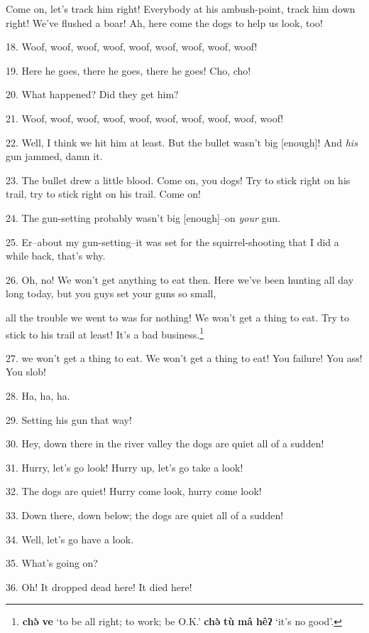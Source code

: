 Come on, let's track him right! Everybody at his ambush-point, track him down right!
We've flushed a boar! Ah, here come the dogs to help us look, too!

18. Woof, woof, woof, woof, woof, woof, woof, woof, woof!

19. Here he goes, there he goes, there he goes! Cho, cho!


20. What happened? Did they get him?

21. Woof, woof, woof, woof, woof, woof, woof, woof, woof, woof!

22. Well, I think we hit him at least. But the bullet wasn't big [enough]! And
\textit{his} gun jammed, damn it.

23. The bullet drew a little blood. Come on, you dogs! Try to stick right on his
trail, try to stick right on his trail. Come on!

24. The gun-setting probably wasn't big [enough]--on \textit{your} gun.

25. Er--about my gun-setting--it was set for the squirrel-shooting that I did a
while back, that's why.

26. Oh, no! We won't get anything to eat then. Here we've been hunting all day
long today, but you guys set your guns so small,

all the trouble we went to was for nothing! We won't get a thing to eat. Try to
stick to his trail at least! It's a bad business.\footnote{\textbf{chə̀} \textbf{ve} `to be all right; to work; be O.K.' \textbf{chə̀} \textbf{tù} \textbf{mâ} \textbf{hêʔ} `it's no good'.}

27. we won't get a thing to eat. We won't get a thing to eat! You failure! You
ass! You slob!

28. Ha, ha, ha.

29. Setting his gun that way!

30. Hey, down there in the river valley the dogs are quiet all of a sudden!

31. Hurry, let's go look! Hurry up, let's go take a look!

32. The dogs are quiet! Hurry come look, hurry come look!

33. Down there, down below; the dogs are quiet all of a sudden!

34. Well, let's go have a look.

35. What's going on?

36. Oh! It dropped dead here! It died here!

